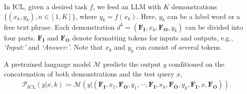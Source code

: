 \documentclass{article} %
\def\chenming#1{{\color{red}{\bf [Chenming:} {{#1}}{\bf ]}}}
\begin{document}

















In ICL, given a desired task $f$, we feed an LLM with $K$ demonstrations $\{(x_k, y_k), n\in[1,K]\}$, where $y_k=f(x_k)$. Here, $y_k$ can be a label word or a free text phrase.
Each demonstration $d^k=(\mathbf{F_I}, x_k, \mathbf{F_O}, y_k)$ can be divided into four parts. 
$\mathbf{F_I}$ and $\mathbf{F_O}$ denote formatting tokens for inputs and outputs, e.g., \emph{`Input:'} and \emph{`Answer:'}. 
Note that $x_k$ and $y_k$ can consist of several tokens. 

A pretrained language model $\mathcal{M}$ predicts the output $y$ conditioned on the concatenation of both demonstrations and the test query $x$,
\begin{gather}
    \mathcal{P}_{\text{ICL}}(y|x,k) \coloneqq \mathcal{M}(y|(\mathbf{F_I}, x_1, \mathbf{F_O}, y_1, \cdots, \mathbf{F_I}, x_k, \mathbf{F_O}, y_k, \mathbf{F_I}, x, \mathbf{F_O})).
    \label{eq:icl}
\end{gather}
\end{document}
